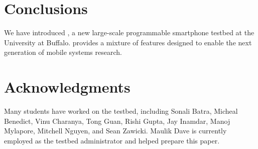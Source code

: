 \section{Conclusions}
\label{sec-conclusions}

We have introduced \PhoneLab{}, a new large-scale programmable smartphone
testbed at the University at Buffalo. \PhoneLab{} provides a mixture of
features designed to enable the next generation of mobile systems research.

\section*{Acknowledgments}

Many students have worked on the \PhoneLab{} testbed, including Sonali Batra,
Micheal Benedict, Vinu Charanya, Tong Guan, Rishi Gupta, Jay Inamdar, Manoj
Mylapore, Mitchell Nguyen, and Sean Zawicki. Maulik Dave is currently
employed as the testbed administrator and helped prepare this paper.
